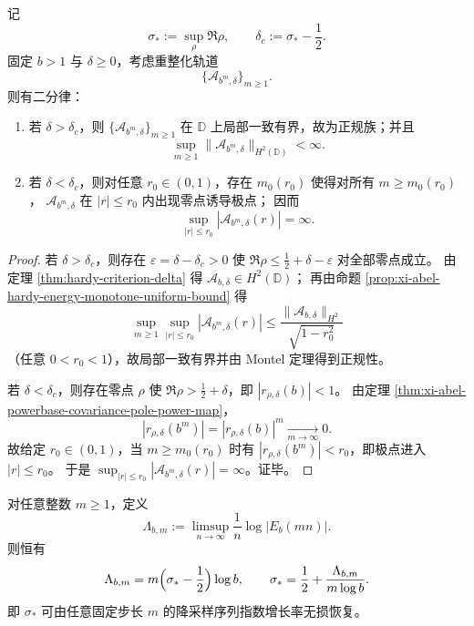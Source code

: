 \begin{theorem}\label{thm:xi-abel-damping-threshold-bifurcation}
记
\[
\sigma_*:=\sup_{\rho}\Re\rho,\qquad
\delta_c:=\sigma_*-\frac12.
\]
固定 \(b>1\) 与 \(\delta\ge 0\)，考虑重整化轨道
\[
\{\mathcal A_{b^m,\delta}\}_{m\ge 1}.
\]
则有二分律：
\begin{enumerate}
  \item 若 \(\delta>\delta_c\)，则 \(\{\mathcal A_{b^m,\delta}\}_{m\ge 1}\) 在 \(\mathbb D\) 上局部一致有界，故为正规族；并且
  \[
  \sup_{m\ge 1}\|\mathcal A_{b^m,\delta}\|_{H^2(\mathbb D)}<\infty.
  \]
  \item 若 \(\delta<\delta_c\)，则对任意 \(r_0\in(0,1)\)，存在 \(m_0(r_0)\) 使得对所有 \(m\ge m_0(r_0)\)，
  \(\mathcal A_{b^m,\delta}\) 在 \(|r|\le r_0\) 内出现零点诱导极点；
  因而
  \[
  \sup_{|r|\le r_0}|\mathcal A_{b^m,\delta}(r)|=\infty.
  \]
\end{enumerate}
\end{theorem}

\begin{proof}
若 \(\delta>\delta_c\)，则存在 \(\varepsilon=\delta-\delta_c>0\) 使
\(
\Re\rho\le \frac12+\delta-\varepsilon
\)
对全部零点成立。
由定理 \ref{thm:hardy-criterion-delta} 得 \(\mathcal A_{b,\delta}\in H^2(\mathbb D)\)；
再由命题 \ref{prop:xi-abel-hardy-energy-monotone-uniform-bound} 得
\[
\sup_{m\ge 1}\sup_{|r|\le r_0}|\mathcal A_{b^m,\delta}(r)|
\le
\frac{\|\mathcal A_{b,\delta}\|_{H^2}}{\sqrt{1-r_0^2}}
\]
（任意 \(0<r_0<1\)），故局部一致有界并由 Montel 定理得到正规性。

若 \(\delta<\delta_c\)，则存在零点 \(\rho\) 使 \(\Re\rho>\frac12+\delta\)，即
\(
|r_{\rho,\delta}(b)|<1
\)。
由定理 \ref{thm:xi-abel-powerbase-covariance-pole-power-map}，
\[
|r_{\rho,\delta}(b^m)|
=|r_{\rho,\delta}(b)|^m
\xrightarrow[m\to\infty]{}0.
\]
故给定 \(r_0\in(0,1)\)，当 \(m\ge m_0(r_0)\) 时有
\(
|r_{\rho,\delta}(b^m)|<r_0
\)，即极点进入 \(|r|\le r_0\)。
于是 \(\sup_{|r|\le r_0}|\mathcal A_{b^m,\delta}(r)|=\infty\)。证毕。
\end{proof}

\begin{corollary}[任意固定步长降采样的增长率反演]\label{cor:xi-abel-fixed-step-growth-recovers-sigma-star}
对任意整数 \(m\ge 1\)，定义
\[
\Lambda_{b,m}:=\limsup_{n\to\infty}\frac{1}{n}\log|E_b(mn)|.
\]
则恒有
\[
\Lambda_{b,m}=m\Bigl(\sigma_*-\frac12\Bigr)\log b,
\qquad
\sigma_*=\frac12+\frac{\Lambda_{b,m}}{m\log b}.
\]
即 \(\sigma_*\) 可由任意固定步长 \(m\) 的降采样序列指数增长率无损恢复。
\end{corollary}


